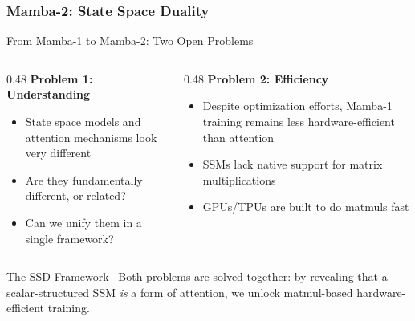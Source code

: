 \subsubsection{Mamba-2: State Space Duality}

\begin{frame}{From Mamba-1 to Mamba-2: Two Open Problems}

  \begin{columns}
    \begin{column}{0.48\textwidth}
      \textbf{Problem 1: Understanding}
      \begin{itemize}
        \item State space models and attention mechanisms look very different
        \item Are they fundamentally different, or related?
        \item Can we unify them in a single framework?
      \end{itemize}
    \end{column}
    \begin{column}{0.48\textwidth}
      \textbf{Problem 2: Efficiency}
      \begin{itemize}
        \item Despite optimization efforts, Mamba-1 training remains \alert{less hardware-efficient} than attention
        \item SSMs lack native support for matrix multiplications
        \item GPUs/TPUs are built to do matmuls fast
      \end{itemize}
    \end{column}
  \end{columns}

  \vspace{1em}
  \begin{alertblock}{The SSD Framework~\cite{dao2024mamba2}}
    Both problems are solved together: by revealing that a scalar-structured SSM \emph{is} a form of attention, we unlock matmul-based hardware-efficient training.
  \end{alertblock}
\end{frame}


